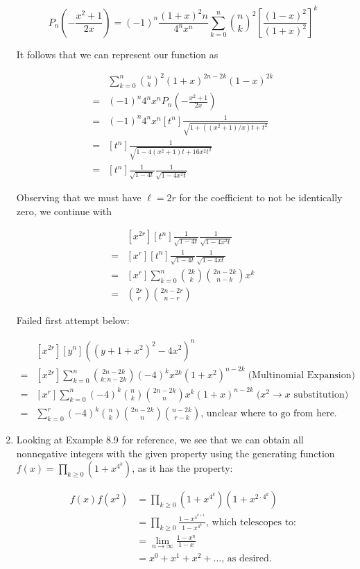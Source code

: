 \documentclass{book}
\numberwithin{equation}{section}
\begin{document}
\begin{enumerate}[label={8.\arabic*}]
$$P_n\left( -\frac{x^2 + 1}{2x} \right) 
= (-1)^n\frac{(1+x)^2n}{4^nx^n}\sum_{k=0}^n {n \choose k}^2 \left[ \frac{(1-x)^2}{(1+x)^2} \right]^k$$

It follows that we can represent our function as

\begin{align*}
& \sum_{k=0}^n {n \choose k}^2 (1+x)^{2n-2k}(1-x)^{2k} \\
= & (-1)^n4^nx^nP_n\left(-\frac{x^2+1}{2x}\right) \\
= & (-1)^n4^nx^n[t^n]\frac{1}{\sqrt{1 + ((x^2 + 1)/x)t + t^2}} \\
= & [t^n]\frac{1}{\sqrt{1 - 4(x^2 + 1)t + 16x^2t^2}} \\
= & [t^n]\frac{1}{\sqrt{1-4t}}\frac{1}{\sqrt{1-4x^2t}}
\end{align*}

Observing that we must have $\ell = 2r$ for the coefficient to not be identically zero, we continue with

\begin{align*}
& [x^{2r}][t^n]\frac{1}{\sqrt{1-4t}}\frac{1}{\sqrt{1-4x^2t}} \\
= & [x^r][t^n]\frac{1}{\sqrt{1-4t}}\frac{1}{\sqrt{1-4xt}} \\
= & [x^r]\sum_{k=0}^n {2k \choose k}{2n-2k \choose n-k}x^k \\
= & {2r \choose r}{2n-2r \choose n-r}
\end{align*}

Failed first attempt below:

\begin{align*}
& [x^{2r}][y^n]\left((y+1+x^2)^2 - 4x^2 \right)^n \\
= & [x^{2r}]\sum_{k=0}^n {2n-2k \choose k; n-2k} (-4)^{k}x^{2k}(1+x^2)^{n-2k} \;\text{(Multinomial Expansion)} \\
= & [x^{r}]\sum_{k=0}^n (-4)^k {n \choose k}{2n-2k \choose n}x^k(1+x)^{n-2k} \;\text{($x^2 \to x$ substitution)} \\
= & \sum_{k=0}^r (-4)^k{n \choose k}{2n-2k \choose n}{n-2k \choose r-k} \text{, unclear where to go from here.}
\end{align*}

\item
Looking at Example 8.9 for reference, we see that we can obtain all nonnegative integers with the given property
using the generating function $f(x) = \prod_{k \geq 0}(1+x^{4^k})$, as it has the property:

\begin{align*}
f(x)f(x^2) & = \prod_{k \geq 0}(1+x^{4^k})(1 + x^{2\cdot4^k}) \\
& = \prod_{k \geq 0}\frac{1-x^{4^{k+1}}}{1-x^{4^k}}\text{, which telescopes to:} \\
& = \lim_{n \to \infty} \frac{1 - x^n}{1-x} \\
& = x^0 + x^1 + x^2 + \ldots \text{, as desired.}
\end{align*}


\end{enumerate}
\end{document}
